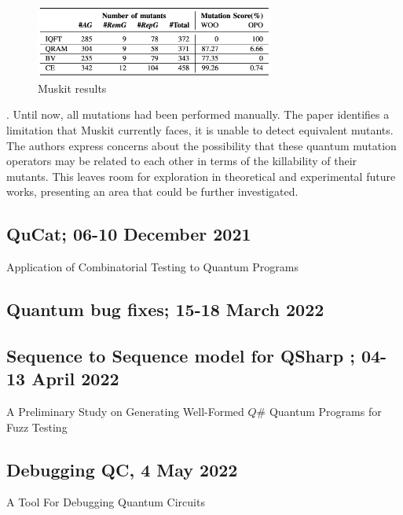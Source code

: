 \begin{itemize}
\begin{figure}[H]
        \centering
        \includegraphics[width=0.7\textwidth]{TFM/photos/MuskitResults.png}
        \caption{Muskit results \cite{mendiluze2021muskit}} 
        \label{Fig:MuskitRes}
\end{figure}

. Until now, all mutations had been performed manually. The paper identifies a limitation that Muskit currently faces, it is unable to detect equivalent mutants. The authors express concerns about the possibility that these quantum mutation operators may be related to each other in terms of the killability of their mutants. This leaves room for exploration in theoretical and experimental future works, presenting an area that could be further investigated.

\vspace{15pt}
\subsection{QuCat; 06-10 December 2021}

Application of Combinatorial Testing to Quantum Programs \cite{wang2021application}

\vspace{15pt}
\subsection{Quantum bug fixes; 15-18 March 2022}

\cite{luo2022comprehensive}

\vspace{15pt}
\subsection{Sequence to Sequence model for QSharp ; 04-13 April 2022}

A Preliminary Study on Generating Well-Formed
$Q\#$ Quantum Programs for Fuzz Testing 

\vspace{15pt}
\subsection{Debugging QC, 4 May 2022}
A Tool For Debugging Quantum Circuits \cite{metwalli2022tool}


\end{itemize}
